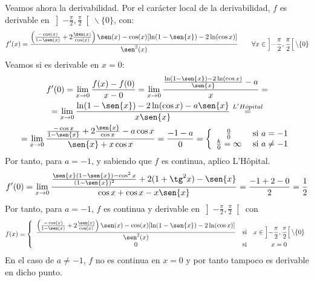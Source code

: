\begin{ejercicio}
    Veamos ahora la derivabilidad. Por el carácter local de la derivabilidad, $f$ es derivable en $\displaystyle \left]-\frac{\pi}{2},\frac{\pi}{2} \right[ \backslash \{0\}$, con:
    \begin{equation*}
        f'(x) = \frac{\left(\frac{-\cos(x)}{1-\sen(x)} +2\frac{\sen(x)}{\cos(x)}\right)\sen(x) -\cos(x)[\ln(1-\sen{x}) -2\ln(\cos{x})]}{\sen^2(x)} \qquad
        \forall x\in \displaystyle \left]-\frac{\pi}{2},\frac{\pi}{2} \right[ \backslash \{0\}
    \end{equation*}
    Veamos si es derivable en $x=0$:
    \begin{multline*}
        f'(0)= \lim_{x\to 0}\frac{f(x)-f(0)}{x-0}
        = \lim_{x\to 0}\frac{\frac{\ln(1-\sen{x}) -2\ln(\cos{x})}{\sen{x}}-a}{x}
        =\\= \lim_{x\to 0}\frac{\ln(1-\sen{x}) -2\ln(\cos{x})-a\sen{x}}{x\sen{x}}
        \stackrel{L'H\hat{o}pital}{=}\\=
        \lim_{x\to 0}\frac{\frac{-\cos{x}}{1-\sen{x}}+2\frac{\sen{x}}{\cos{x}} -a\cos{x}}{\sen{x}+x\cos{x}}=\frac{-1-a}{0} = 
        \left\{
        \begin{array}{cc}
            \frac{0}{0} & \text{ si } a=-1   \\
            \frac{k}{0} = \infty & \text{ si } a\neq-1 
        \end{array}
        \right.
    \end{multline*}
    Por tanto, para $a=-1$, y sabiendo que $f$ es continua, aplico L'Hôpital.
    \begin{equation*}
        f'(0)=\lim_{x\to 0} \frac{\frac{\sen{x}(1-\sen{x}) -\cos^2{x}}{(1-\sen{x})^2} +2(1+\tg^2{x}) -\sen{x}}{\cos{x}+\cos{x} -x\sen{x}} = \frac{-1+2-0}{2}=\frac{1}{2}
    \end{equation*}
    Por tanto, para $a=-1$, $f$ es continua y derivable en $\displaystyle \left]-\frac{\pi}{2},\frac{\pi}{2} \right[$ con
    $$f(x)=\left\{
    \begin{array}{ccc}
    \displaystyle \frac{\left(\frac{-\cos(x)}{1-\sen(x)} +2\frac{\sen(x)}{\cos(x)}\right)\sen(x) -\cos(x)[\ln(1-\sen{x}) -2\ln(\cos{x})]}{\sen^2(x)} & \text{si} & x\in \displaystyle \left]-\frac{\pi}{2},\frac{\pi}{2} \right[ \backslash \{0\} \\
    0 & \text{si} & x=0
    \end{array}\right.$$
    En el caso de $a\neq-1$, $f$ no es continua en $x=0$ y por tanto tampoco es derivable en dicho punto.
    
\end{ejercicio}


